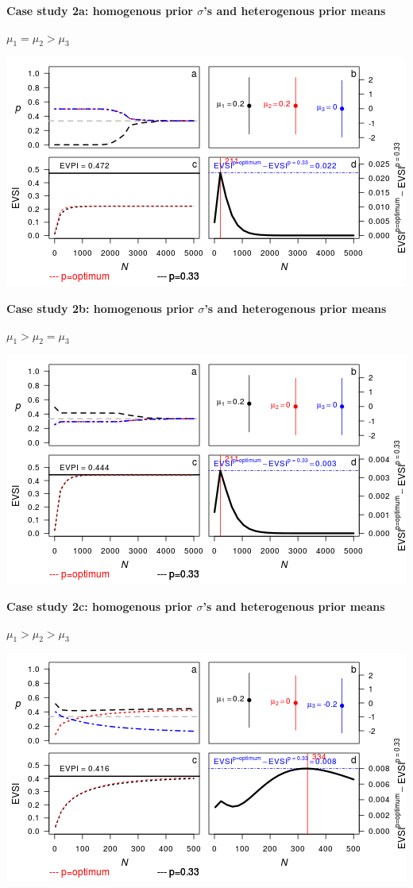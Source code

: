 \textbf{Case study 2a: homogenous prior \(\sigma\)'s and heterogenous
prior means}

\(\mu_1 = \mu_2 > \mu_3\)

\includegraphics{figure/x110_1_1_1c-1.png} \clearpage

\textbf{Case study 2b: homogenous prior \(\sigma\)'s and heterogenous
prior means}

\(\mu_1 > \mu_2 = \mu_3\)

\includegraphics{figure/x100_1_1_1c-1.png} \clearpage

\textbf{Case study 2c: homogenous prior \(\sigma\)'s and heterogenous
prior means}

\(\mu_1 > \mu_2 > \mu_3\)

\includegraphics{figure/x10n1_1_1_1c-1.png} \clearpage

